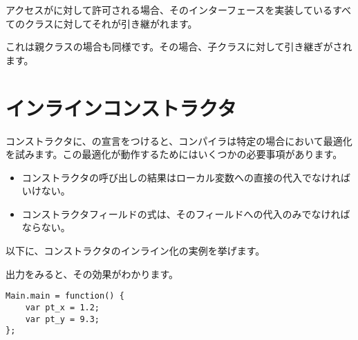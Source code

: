 
アクセスがに対して許可される場合、そのインターフェースを実装しているすべてのクラスに対してそれが引き継がれます。


これは親クラスの場合も同様です。その場合、子クラスに対して引き継ぎがされます。


\section{インラインコンストラクタ}
\label{lf-inline-constructor}

コンストラクタに、の宣言をつけると、コンパイラは特定の場合において最適化を試みます。この最適化が動作するためにはいくつかの必要事項があります。

\begin{itemize}
	\item コンストラクタの呼び出しの結果はローカル変数への直接の代入でなければいけない。
	\item コンストラクタフィールドの式は、そのフィールドへの代入のみでなければならない。
\end{itemize}

以下に、コンストラクタのインライン化の実例を挙げます。


出力をみると、その効果がわかります。

\begin{lstlisting}
Main.main = function() {
	var pt_x = 1.2;
	var pt_y = 9.3;
};
\end{lstlisting}

